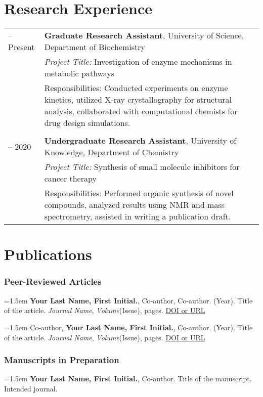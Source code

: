 \documentclass[a4paper,10pt]{article}
\begin{document}
\section*{Research Experience}
\begin{tabularx}{\textwidth}{>{\raggedright\arraybackslash}p{2.5cm} X}
2020 -- Present & \textbf{Graduate Research Assistant}, University of Science, Department of Biochemistry \\
                & \textit{Project Title:} Investigation of enzyme mechanisms in metabolic pathways \\
                & Responsibilities: Conducted experiments on enzyme kinetics, utilized X-ray crystallography for structural analysis, collaborated with computational chemists for drug design simulations. \\
\\
2018 -- 2020    & \textbf{Undergraduate Research Assistant}, University of Knowledge, Department of Chemistry \\
                & \textit{Project Title:} Synthesis of small molecule inhibitors for cancer therapy \\
                & Responsibilities: Performed organic synthesis of novel compounds, analyzed results using NMR and mass spectrometry, assisted in writing a publication draft. \\
\end{tabularx}

\section*{Publications}

\subsubsection*{Peer-Reviewed Articles}
\hangindent=1.5em 
\textbf{Your Last Name, First Initial.}, Co-author, Co-author. (Year). Title of the article. \textit{Journal Name}, \textit{Volume}(Issue), pages. \href{DOI or URL}{DOI or URL}

\hangindent=1.5em 
\noindent Co-author, \textbf{Your Last Name, First Initial.}, Co-author. (Year). Title of the article. \textit{Journal Name}, \textit{Volume}(Issue), pages. \href{DOI or URL}{DOI or URL}

\subsubsection*{Manuscripts in Preparation}
\hangindent=1.5em 
\textbf{Your Last Name, First Initial.}, Co-author. Title of the manuscript. Intended journal.
\end{document}
